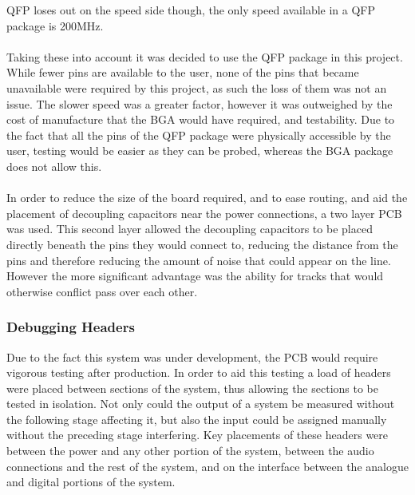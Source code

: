 QFP loses out on the speed side though, the only speed available in a QFP package is 200MHz.
\\
\\
Taking these into account it was decided to use the QFP package in this project.
While fewer pins are available to the user, none of the pins that became unavailable were required by this project, as such the loss of them was not an issue.
The slower speed was a greater factor, however it was outweighed by the cost of manufacture that the BGA would have required, and testability.
Due to the fact that all the pins of the QFP package were physically accessible by the user, testing would be easier as they can be probed, whereas the BGA package does not allow this.
\\
\\
In order to reduce the size of the board required, and to ease routing, and aid the placement of decoupling capacitors near the power connections, a two layer PCB was used.
This second layer allowed the decoupling capacitors to be placed directly beneath the pins they would connect to, reducing the distance from the pins and therefore reducing the amount of noise that could appear on the line.
However the more significant advantage was the ability for tracks that would otherwise conflict pass over each other.

\subsubsection{Debugging Headers}
Due to the fact this system was under development, the PCB would require vigorous testing after production.
In order to aid this testing a load of headers were placed between sections of the system, thus allowing the sections to be tested in isolation.
Not only could the output of a system be measured without the following stage affecting it, but also the input could be assigned manually without the preceding stage interfering.
Key placements of these headers were between the power and any other portion of the system, between the audio connections and the rest of the system, and on the interface between the analogue and digital portions of the system.


